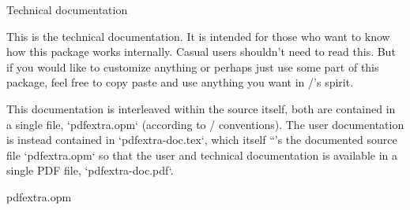 \enditems

\chap Technical documentation

This is the technical documentation. It is intended for those who want to know
how this package works internally. Casual users shouldn't need to read this. But
if you would like to customize anything or perhaps just use some part of this
package, feel free to copy paste and use anything you want in \OpTeX/'s spirit.

This documentation is interleaved within the source itself, both are contained
in a single file, `pdfextra.opm` (according to \OpTeX/ conventions). The user
documentation is instead contained in `pdfextra-doc.tex`, which itself
``'s the documented source file `pdfextra.opm` so that the user and
technical documentation is available in a single PDF file, `pdfextra-doc.pdf`.

\printdoc     pdfextra.opm

\bye

